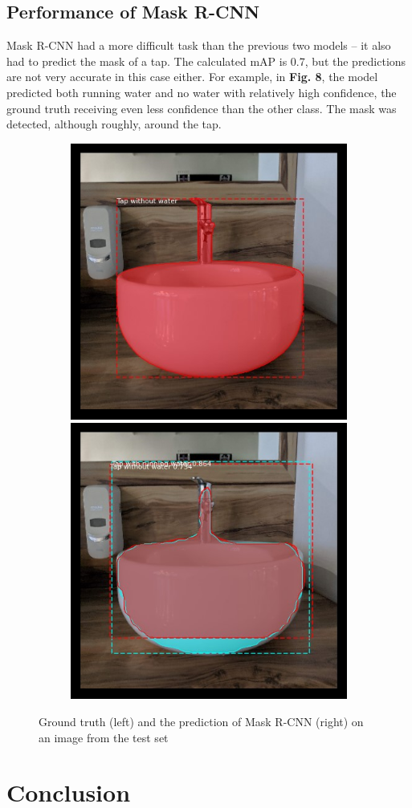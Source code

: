 \documentclass[journal,onecolumn]{IEEEtran}
\begin{document}
\subsection{Performance of Mask R-CNN}

Mask R-CNN had a more difficult task than the previous two models – it also had to predict the mask of a tap. The calculated mAP is 0.7, but the predictions are not very accurate in this case either. For example, in \textbf{Fig. 8}, the model predicted both running water and no water with relatively high confidence, the ground truth receiving even less confidence than the other class. The mask was detected, although roughly, around the tap.

\begin{figure}[htb]
    \centering
    \begin{subfigure}[b]{\textwidth}
        \centering
        \includegraphics[width=0.475\linewidth]{figures/mask-rcnn-truth.jpg}%
        \hfill
        \includegraphics[width=0.475\linewidth]{figures/mask-rcnn-prediction.jpg}
    \end{subfigure}
    \caption{Ground truth (left) and the prediction of Mask R-CNN (right) on an image from the test set}
\end{figure}

\section{Conclusion}
\end{document}
